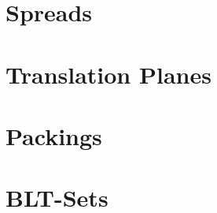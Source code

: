 
\section{Spreads}
\label{sec:spreads}




\bigskip

\clearpage


\section{Translation Planes}
\label{sec:translation:planes}




\bigskip

\clearpage


\section{Packings}
\label{sec:packings}



	

\clearpage

\section{BLT-Sets}
\label{sec:BLT:sets}



\clearpage
